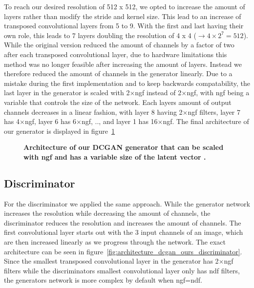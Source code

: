             To reach our desired resolution of 512 x 512, we opted to increase the amount of layers rather than modify the stride and kernel size. This lead to an increase of transposed convolutional layers from 5 to 9. With the first and last having their own role, this leads to 7 layers doubling the resolution of 4 x 4 ($\rightarrow 4 \times 2^7 = 512$). While the original version reduced the amount of channels by a factor of two after each transposed convolutional layer, due to hardware limitations this method was no longer feasible after increasing the amount of layers. Instead we therefore reduced the amount of channels in the generator linearly. Due to a mistake during the first implementation and to keep backwards compatability, the last layer in the generator is scaled with 2$\times$ngf instead of 2$\times$ngf, with ngf being a variable that controls the size of the network. Each layers amount of output channels decreases in a linear fashion, with layer 8 having 2$\times$ngf filters, layer 7 has 4$\times$ngf, layer 6 has 6$\times$ngf, .., and layer 1 has 16$\times$ngf. The final architecture of our generator is displayed in figure~\ref{fig:architecture_dcgan_ours_generator}
        
            \begin{figure}[ht]
                \centering
                \caption[DCGAN generator architecture]
                {
                    \textbf{Architecture of our DCGAN generator that can be scaled with ngf and has a variable size of the latent vector .}
                }
                \label{fig:architecture_dcgan_ours_generator}
            \end{figure}

        \subsection{Discriminator}

            For the discriminator we applied the same approach. While the generator network increases the resolution while decreasing the amount of channels, the discriminator reduces the resolution and increases the amount of channels. The first convolutional layer starts out with the 3 input channels of an image, which are then increased linearly as we progress through the network. The exact architecture can be seen in figure~\ref{fig:architecture_dcgan_ours_discriminator}. Since the smallest transposed convolutional layer in the generator has 2$\times$ngf filters while the discriminators smallest convolutional layer only has ndf filters, the generators network is more complex by default when ngf=ndf.

